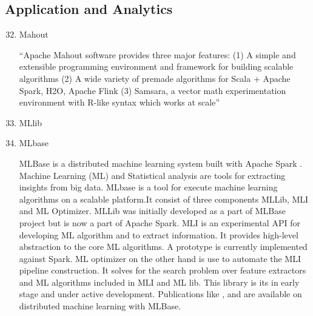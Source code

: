 \subsection{Application and Analytics}
\label{\detokenize{i524/technologies:application-and-analytics}}\begin{enumerate}
\setcounter{enumi}{31}
\item {} 
Mahout \label{\detokenize{i524/technologies:id64}}{\hyperref[\detokenize{i524/technologies:www-mahout}]{\sphinxcrossref{{[}55{]}}}}

``Apache Mahout software provides three major features:
(1) A simple and extensible programming environment and framework
for building scalable algorithms
(2) A wide variety of premade algorithms for Scala + Apache Spark,
H2O, Apache Flink
(3) Samsara, a vector math experimentation environment with R-like
syntax which works at scale''

\item {} 
MLlib

\item {} 
MLbase

MLBase \label{\detokenize{i524/technologies:id65}}{\hyperref[\detokenize{i524/technologies:www-mlbase}]{\sphinxcrossref{{[}56{]}}}} is a distributed machine learning
system built with Apache Spark \label{\detokenize{i524/technologies:id66}}{\hyperref[\detokenize{i524/technologies:www-spark}]{\sphinxcrossref{{[}57{]}}}}. Machine Learning
(ML) and Statistical analysis are tools for extracting insights
from big data. MLbase is a tool for execute machine learning
algorithms on a scalable platform.It consist of three components
MLLib, MLI and ML Optimizer. MLLib was initially developed as a
part of MLBase project but is now a part of Apache Spark. MLI is
an experimental API for developing ML algorithm and to extract
information. It provides high-level abstraction to the core ML
algorithms. A prototype is currently implemented against Spark. ML
optimizer on the other hand is use to automate the MLI pipeline
construction. It solves for the search problem over feature
extractors and ML algorithms included in MLI and ML lib. This
library is its in early stage and under active
development. Publications like \label{\detokenize{i524/technologies:id67}}{\hyperref[\detokenize{i524/technologies:mlbasepub1}]{\sphinxcrossref{{[}58{]}}}},
\label{\detokenize{i524/technologies:id68}}{\hyperref[\detokenize{i524/technologies:mlbasepub2}]{\sphinxcrossref{{[}59{]}}}} and \label{\detokenize{i524/technologies:id69}}{\hyperref[\detokenize{i524/technologies:mlbasepub3}]{\sphinxcrossref{{[}60{]}}}} are available on
distributed machine learning with MLBase.


\end{enumerate}
